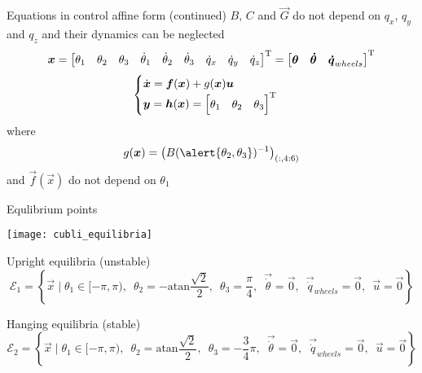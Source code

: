 \begin{frame}{Equations in control affine form (continued)}
  $B$, $C$ and $\vec{G}$ do \alert{not} depend on $q_x$, $q_y$ and $q_z$ and their dynamics can be neglected
  \[
  \boldsymbol{x} =
  \begin{bmatrix}
    \theta_1 & \theta_2 & \theta_3 & \dot{\theta}_1 & \dot{\theta}_2 & \dot{\theta}_3 & \dot{q}_x & \dot{q}_y & \dot{q}_z
  \end{bmatrix}^{\mathrm{T}} = \begin{bmatrix}
    \boldsymbol{\theta} & \boldsymbol{\dot{\theta}} & \boldsymbol{\dot{q}}_{wheels}
  \end{bmatrix}^{\mathrm{T}}
  \]
  \[
  \begin{cases}
    \dot{\boldsymbol{x}} = \boldsymbol{f}(\boldsymbol{x}) + g(\boldsymbol{x}) \boldsymbol{u} \\
    \boldsymbol{y} = \boldsymbol{h}(\boldsymbol{x}) =
    \begin{bmatrix}
      \theta_1 &
      \theta_2 &
      \theta_3
    \end{bmatrix} ^{\mathrm{T}}
  \end{cases}
  \]
  where
  \[
  g(\vec{x}) = \left(B(\alert{\theta_2,\theta_3}) ^ {-1}\right)_{(:, 4:6)}
  \]
  and $\vec{f}(\vec{x})$ do \alert{not} depend on $\theta_1$

\end{frame}

\begin{frame}[shrink = 30]{Equlibrium points}
  \begin{center}
    \texttt{[image: cubli\_equilibria]}
  \end{center}
  \begin{block}{Upright equilibria (unstable)}
    \[
    \mathcal{E}_{1} = \left\{ \vec{x} \mid \theta_1 \in [-\pi, \pi),\enspace \theta_2 = -\mathrm{atan}\frac{\sqrt{2}}{2},\enspace
      \theta_3 = \frac{\pi}{4},\enspace
      \vec{\dot{\theta}} = \vec{0},\enspace
      \vec{\dot{q}}_{wheels} = \vec{0},\enspace
      \vec{u} = \vec{0}
      \right\}
      \]
  \end{block}
  \begin{block}{Hanging equilibria (stable)}
    \[
    \mathcal{E}_{2} = \left\{
    \vec{x} \mid \theta_1 \in [-\pi, \pi),\enspace
      \theta_2 = \mathrm{atan}\frac{\sqrt{2}}{2},\enspace
      \theta_3 = -\frac{3}{4} \pi,\enspace
      \vec{\dot{\theta}} = \vec{0},\enspace
      \vec{\dot{q}}_{wheels} = \vec{0},\enspace
      \vec{u} = \vec{0}
      \right\}
      \]
  \end{block}
\end{frame}
